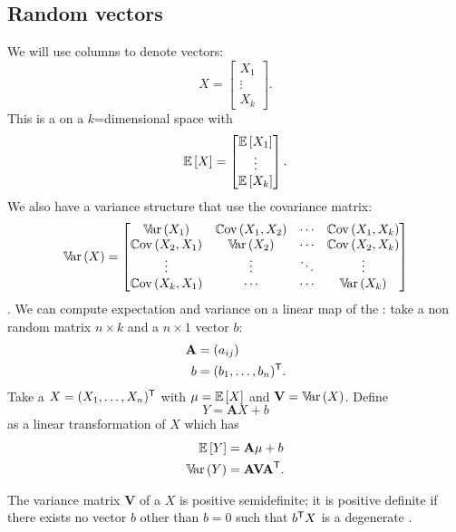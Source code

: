 \documentclass[12pt]{report}
\begin{document}
\subsection{Random vectors}
We will use columns to denote vectors:
\begin{equation*}
	X=\begin{bmatrix}
		X_{1}\\
		\vdots\\
		X_{k}
	\end{bmatrix}.
\end{equation*}
This is a \rv{} on a $k$=dimensional space with
\begin{equation*}
	\mathbb{E}\left[X\right]=\begin{bmatrix}\mathbb{E}\left[X_{1}\right]\\\vdots\\\mathbb{E}\left[X_{k}\right]\end{bmatrix}.
\end{equation*}
We also have a variance structure that use the covariance matrix:
\begin{equation*}
	\mathbb{V}\!\mathrm{ar}\,(X)=\begin{bmatrix}
		\mathbb{V}\!\mathrm{ar}\,(X_{1})&\mathbb{C}\mathrm{ov}\,(X_{1},X_{2})&\cdots&\mathbb{C}\mathrm{ov}\,(X_{1},X_{k})\\
		\mathbb{C}\mathrm{ov}\,(X_{2},X_{1})&\mathbb{V}\!\mathrm{ar}\,(X_{2})&\cdots&\mathbb{C}\mathrm{ov}\,(X_{2},X_{k})\\
		\vdots&\vdots&\ddots&\vdots\\
		\mathbb{C}\mathrm{ov}\,(X_{k},X_{1})&\cdots&\cdots&\mathbb{V}\!\mathrm{ar}\,(X_{k})
	\end{bmatrix}
\end{equation*}.
We can compute expectation and variance on a linear map of the \rv: take a non random matrix $n\times k$ and a $n\times 1$ vector $b$:
\begin{align*}
	\mathbf{A}&=(a_{ij})\\
	b&=(b_{1},\ldots,b_{n})^{\mathsf{T}}.
\end{align*}
Take a \rv{} $X=(X_{1},\ldots,X_{n})^{\mathsf{T}}$ with $\mu=\mathbb{E}\left[X\right]$ and $\mathbf{V}=\mathbb{V}\!\mathrm{ar}\,(X)$. Define 
\begin{equation*}
	Y=\mathbf{A}X+b
\end{equation*}
as a linear transformation of $X$ which has
\begin{align*}
	\mathbb{E}\left[Y\right]&=\mathbf{A}\mu+b\\
	\mathbb{V}\!\mathrm{ar}\,(Y)&=\mathbf{AVA}^{\mathsf{T}}.
\end{align*}
\begin{proposition}
	The variance matrix $\mathbf{V}$ of a \rv{} $X$ is positive semidefinite; it is positive definite if there exists no vector $b$ other than $b=0$ such that $b^{\mathsf{T}}X$ is a degenerate \rv.
	\end{proposition}
\end{document}
